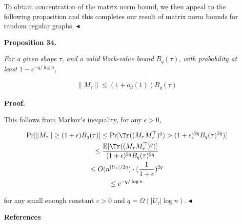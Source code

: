 To obtain concentration of the matrix norm bound, we then appeal to the following proposition and this completes our result of matrix norm bounds for random regular graphs.
$\blacktriangleleft$\par





\par\medskip\noindent\textbf{
\textbf{Proposition 34}\textbf{.}
}\par



\emph{For a given shape $\tau$, and a valid block-value bound $B_{q}(\tau)$, with probability at least $1-c^{-q/\log n}$,}\par


\[\begin{gathered}
\|M_{\tau}\|\leq(1+o_{d}(1))B_{q}(\tau)
\end{gathered}\]







\par\medskip\noindent\textbf{Proof.}\par




This follows from Markov’s inequality, for any $\epsilon>0$,\par


\[\begin{gathered}
\displaystyle\Pr[\|M_{\tau}\|\geq(1+\epsilon)B_{q}(\tau)] \displaystyle\leq\Pr[\Tr((M_{\tau}M_{\tau}^{\top})^{q})>(1+\epsilon)^{2q}B_{q}(\tau)^{2q})] \\
\displaystyle\leq\frac{\mathbb{E}[\Tr((M_{\tau}M_{\tau}^{\top})^{q})]}{(1+\epsilon)^{2q}B_{q}(\tau)^{2q}} \\
\displaystyle\leq O(n^{|U_{\tau}|/2q})\cdot(\frac{1}{1+\epsilon})^{2q} \\
\displaystyle\leq c^{-q/\log n}
\end{gathered}\]


for any small enough constant $c>0$ and $q=\Omega(|U_{\tau}|\log n)$.
$\blacktriangleleft$\par







\par\medskip\noindent\textbf{References}\par



